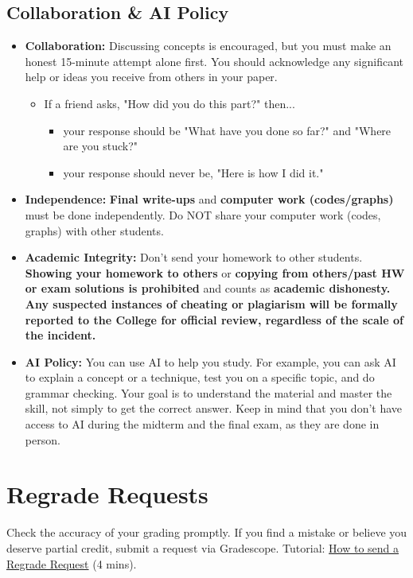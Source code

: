 \documentclass[11pt]{article}
\begin{document}
\subsection{Collaboration \& AI Policy}
\begin{itemize}
    \item \textbf{Collaboration:} Discussing concepts is encouraged, but you must make an honest 15-minute attempt alone first. You should acknowledge any significant help or ideas you receive from others in your paper.
    \begin{itemize}
    \item If a friend asks, "How did you do this part?" then...
    \begin{itemize}
        \item your response should be "What have you done so far?" and "Where are you stuck?"
        \item your response should never be, "Here is how I did it."
    \end{itemize}
    \end{itemize}
    \item \textbf{Independence:} \textbf{Final write-ups} and \textbf{computer work (codes/graphs)} must be done independently. Do NOT share your computer work (codes, graphs) with other students. 
    \item \textbf{Academic Integrity:} Don't send your homework to other students. \textbf{Showing your homework to others} or \textbf{copying from others/past HW or exam solutions is prohibited} and counts as \textbf{\color{red} academic dishonesty. Any suspected instances of cheating or plagiarism will be formally reported to the College for official review, regardless of the scale of the incident.}
    \item \textbf{AI Policy:} You can use AI to help you study. For example, you can ask AI to explain a concept or a technique, test you on a specific topic, and do grammar checking. Your goal is to understand the material and master the skill, not simply to get the correct answer. Keep in mind that you don't have access to AI during the midterm and the final exam, as they are done in person.
\end{itemize}

\section{Regrade Requests}
Check the accuracy of your grading promptly. If you find a mistake or believe you deserve partial credit, submit a request via Gradescope. 
Tutorial: \href{https://youtu.be/TOHCkI12mh0}{How to send a Regrade Request} (4 mins).
\end{document}
